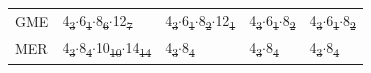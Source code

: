 \documentclass[preprint,numrefs,noinfo,sort&compress]{elsarticle}
\providecommand{\DIFadd}[1]{{\protect\color{blue}\uwave{#1}}} %
\providecommand{\DIFdel}[1]{{\protect\color{red}\sout{#1}}}                      %
\providecommand{\DIFaddFL}[1]{\DIFadd{#1}} %
\providecommand{\DIFdelFL}[1]{\DIFdel{#1}} %
\providecommand{\DIFaddbeginFL}{} %
\providecommand{\DIFaddendFL}{} %
\providecommand{\DIFdelbeginFL}{} %
\providecommand{\DIFdelendFL}{} %
\newcommand{\DIFscaledelfig}{0.5}
\newlength{\DIFdelgraphicswidth} %
\newlength{\DIFdelgraphicsheight} %
\newcommand{\DIFaddincludegraphics}[2][]{{\color{blue}\fbox{\DIFOincludegraphics[#1]{#2}}}} %
\newcommand{\DIFdelincludegraphics}[2][]{%
\sbox{\DIFdelgraphicsbox}{\DIFOincludegraphics[#1]{#2}}%
\settoboxwidth{\DIFdelgraphicswidth}{\DIFdelgraphicsbox} %
\settoboxtotalheight{\DIFdelgraphicsheight}{\DIFdelgraphicsbox} %
\scalebox{\DIFscaledelfig}{%
\parbox[b]{\DIFdelgraphicswidth}{\usebox{\DIFdelgraphicsbox}\\[-\baselineskip] \rule{\DIFdelgraphicswidth}{0em}}\llap{\resizebox{\DIFdelgraphicswidth}{\DIFdelgraphicsheight}{%
\setlength{\unitlength}{\DIFdelgraphicswidth}%
\begin{picture}(1,1)%
\thicklines\linethickness{2pt} %
{\color[rgb]{1,0,0}\put(0,0){\framebox(1,1){}}}%
{\color[rgb]{1,0,0}\put(0,0){\line( 1,1){1}}}%
{\color[rgb]{1,0,0}\put(0,1){\line(1,-1){1}}}%
\end{picture}%
}\hspace*{3pt}}} %
} %
\DeclareRobustCommand{\DIFaddbeginFL}{\DIFOaddbeginFL \let\includegraphics\DIFaddincludegraphics} %
\DeclareRobustCommand{\DIFaddendFL}{\DIFOaddendFL \let\includegraphics\DIFOincludegraphics} %
\DeclareRobustCommand{\DIFdelbeginFL}{\DIFOdelbeginFL \let\includegraphics\DIFdelincludegraphics} %
\DeclareRobustCommand{\DIFdelendFL}{\DIFOaddendFL \let\includegraphics\DIFOincludegraphics} %
\begin{document}
\begin{table}
\begin{threeparttable}
{\begin{tabular}{lllll}
GME & 4\DIFdelbeginFL \DIFdelFL{\textsubscript{3}\(\cdot\)}\DIFdelendFL \DIFaddbeginFL \DIFaddFL{\(_{\text{3}} \cdot\)}\DIFaddendFL 6\DIFdelbeginFL \DIFdelFL{\textsubscript{1}\(\cdot\)}\DIFdelendFL \DIFaddbeginFL \DIFaddFL{\(_{\text{1}} \cdot\)}\DIFaddendFL 8\DIFdelbeginFL \DIFdelFL{\textsubscript{6}\(\cdot\)}\DIFdelendFL \DIFaddbeginFL \DIFaddFL{\(_{\text{6}} \cdot\)}\DIFaddendFL 12\DIFdelbeginFL \DIFdelFL{\textsubscript{7} }\DIFdelendFL \DIFaddbeginFL \DIFaddFL{\(_{\text{7}}\) }\DIFaddendFL & 4\DIFdelbeginFL \DIFdelFL{\textsubscript{3}\(\cdot\)}\DIFdelendFL \DIFaddbeginFL \DIFaddFL{\(_{\text{3}} \cdot\)}\DIFaddendFL 6\DIFdelbeginFL \DIFdelFL{\textsubscript{1}\(\cdot\)}\DIFdelendFL \DIFaddbeginFL \DIFaddFL{\(_{\text{1}} \cdot\)}\DIFaddendFL 8\DIFdelbeginFL \DIFdelFL{\textsubscript{2}\(\cdot\)}\DIFdelendFL \DIFaddbeginFL \DIFaddFL{\(_{\text{2}} \cdot\)}\DIFaddendFL 12\DIFdelbeginFL \DIFdelFL{\textsubscript{1} }\DIFdelendFL \DIFaddbeginFL \DIFaddFL{\(_{\text{1}}\) }\DIFaddendFL & 4\DIFdelbeginFL \DIFdelFL{\textsubscript{3}\(\cdot\)}\DIFdelendFL \DIFaddbeginFL \DIFaddFL{\(_{\text{3}} \cdot\)}\DIFaddendFL 6\DIFdelbeginFL \DIFdelFL{\textsubscript{1}\(\cdot\)}\DIFdelendFL \DIFaddbeginFL \DIFaddFL{\(_{\text{1}} \cdot\)}\DIFaddendFL 8\DIFdelbeginFL \DIFdelFL{\textsubscript{2} }\DIFdelendFL \DIFaddbeginFL \DIFaddFL{\(_{\text{2}}\) }\DIFaddendFL & 4\DIFdelbeginFL \DIFdelFL{\textsubscript{3}\(\cdot\)}\DIFdelendFL \DIFaddbeginFL \DIFaddFL{\(_{\text{3}} \cdot\)}\DIFaddendFL 6\DIFdelbeginFL \DIFdelFL{\textsubscript{1}\(\cdot\)}\DIFdelendFL \DIFaddbeginFL \DIFaddFL{\(_{\text{1}} \cdot\)}\DIFaddendFL 8\DIFdelbeginFL \DIFdelFL{\textsubscript{2}}\DIFdelendFL \DIFaddbeginFL \DIFaddFL{\(_{\text{2}}\)}\DIFaddendFL \\
MER & 4\DIFdelbeginFL \DIFdelFL{\textsubscript{3}\(\cdot\)}\DIFdelendFL \DIFaddbeginFL \DIFaddFL{\(_{\text{3}} \cdot\)}\DIFaddendFL 8\DIFdelbeginFL \DIFdelFL{\textsubscript{4}\(\cdot\)}\DIFdelendFL \DIFaddbeginFL \DIFaddFL{\(_{\text{4}} \cdot\)}\DIFaddendFL 10\DIFdelbeginFL \DIFdelFL{\textsubscript{10}\(\cdot\)}\DIFdelendFL \DIFaddbeginFL \DIFaddFL{\(_{\text{10}} \cdot\)}\DIFaddendFL 14\DIFdelbeginFL \DIFdelFL{\textsubscript{14} }\DIFdelendFL \DIFaddbeginFL \DIFaddFL{\(_{\text{14}}\) }\DIFaddendFL & 4\DIFdelbeginFL \DIFdelFL{\textsubscript{3}\(\cdot\)}\DIFdelendFL \DIFaddbeginFL \DIFaddFL{\(_{\text{3}} \cdot\)}\DIFaddendFL 8\DIFdelbeginFL \DIFdelFL{\textsubscript{4} }\DIFdelendFL \DIFaddbeginFL \DIFaddFL{\(_{\text{4}}\) }\DIFaddendFL & 4\DIFdelbeginFL \DIFdelFL{\textsubscript{3}\(\cdot\)}\DIFdelendFL \DIFaddbeginFL \DIFaddFL{\(_{\text{3}} \cdot\)}\DIFaddendFL 8\DIFdelbeginFL \DIFdelFL{\textsubscript{4} }\DIFdelendFL \DIFaddbeginFL \DIFaddFL{\(_{\text{4}}\) }\DIFaddendFL & 4\DIFdelbeginFL \DIFdelFL{\textsubscript{3}\(\cdot\)}\DIFdelendFL \DIFaddbeginFL \DIFaddFL{\(_{\text{3}} \cdot\)}\DIFaddendFL 8\DIFdelbeginFL \DIFdelFL{\textsubscript{4}}\DIFdelendFL \DIFaddbeginFL \DIFaddFL{\(_{\text{4}}\)}\DIFaddendFL \\

\end{tabular}}
\end{threeparttable}
\end{table}
\end{document}
